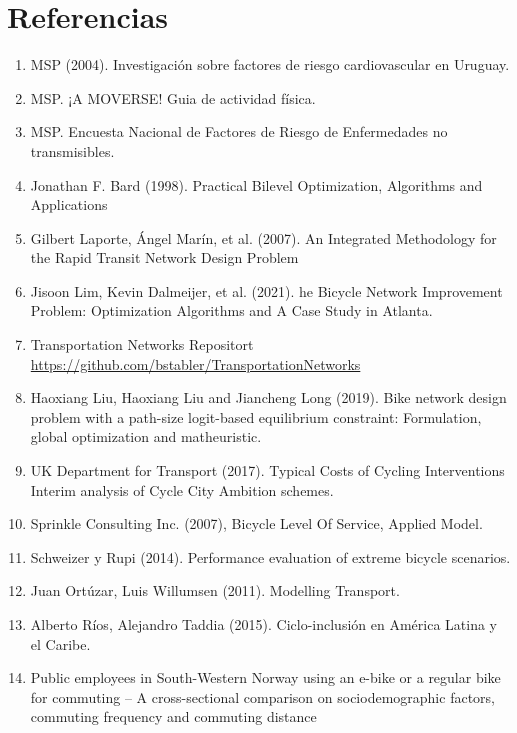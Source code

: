 \documentclass{article}
\begin{document}
  \section{Referencias}

  \begin{enumerate}
    \item{\label{heartrisksuy} MSP (2004). Investigación sobre factores de riesgo cardiovascular en Uruguay.}
    \item{\label{mspphisicalactivityguid} MSP. ¡A MOVERSE! Guia de actividad física.}
    \item{\label{mspsurveyriskfactors} MSP. Encuesta Nacional de Factores de Riesgo de Enfermedades no transmisibles.}
    \item{\label{bardbook} Jonathan F. Bard (1998). Practical Bilevel Optimization, Algorithms and Applications}
    \item{\label{laporte2007} Gilbert Laporte, Ángel Marín, et al. (2007). An Integrated Methodology for the Rapid Transit Network Design Problem}
    \item{\label{lim2021}} Jisoon Lim, Kevin Dalmeijer, et al. (2021). he Bicycle Network Improvement Problem: Optimization Algorithms and A Case Study in Atlanta.
    \item{\label{transportationnetworkrepo} Transportation Networks Repositort \url{https://github.com/bstabler/TransportationNetworks}}
    \item{\label{liu2019} Haoxiang Liu, Haoxiang Liu and Jiancheng Long (2019). Bike network design problem with a path-size logit-based equilibrium constraint: Formulation, global optimization and matheuristic.}
    \item{\label{typicalcostsofcylcing} UK Department for Transport (2017). Typical Costs of Cycling Interventions Interim analysis of Cycle City Ambition schemes.}
    \item{\label{blos2007} Sprinkle Consulting Inc. (2007), Bicycle Level Of Service, Applied Model.}
    \item{\label{shwe2014} Schweizer y Rupi (2014). Performance evaluation of extreme bicycle scenarios.}
    \item{\label{ortuz2011} Juan Ortúzar, Luis Willumsen (2011). Modelling Transport.}
    \item{\label{rios2015} Alberto Ríos, Alejandro Taddia (2015). Ciclo-inclusión en América Latina y el Caribe.}
    \item{\label{anette2018} Public employees in South-Western Norway using an e-bike or a regular bike for commuting – A cross-sectional comparison on sociodemographic factors, commuting frequency and commuting distance}
  \end{enumerate}
\end{document}
